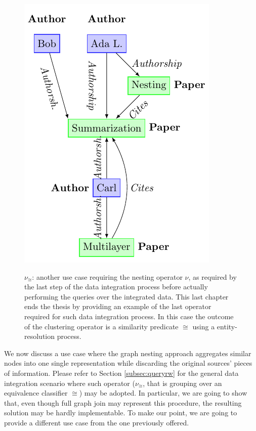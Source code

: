 \begin{figure}
\begin{minipage}{\textwidth}
\centering
\includegraphics[scale=1]{fig/06nesting/02_result}
\label{fig:expresult}
\end{minipage}
\caption{$\nu_\cong$: another use case requiring the nesting operator $\nu$, as required by the last step of the data integration process before actually performing the queries over the integrated data. This last chapter ends the thesis by providing an example of the last operator required for such data integration process. In this case the outcome of the clustering operator is a similarity predicate $\cong$ using a entity-resolution process.}
\end{figure}
We now discuss a use case where the graph nesting approach aggregates similar nodes into one single representation while discarding the original sources' pieces of information. Please refer to Section \vref{subsec:queryrw} for the general data integration scenario where such operator ($\nu_\cong$, that is grouping over an equivalence classifier $\cong$) may be adopted. In particular, we are going to show that, even though full graph join may represent this procedure, the resulting solution may be hardly implementable. To make our point, we are going to provide a different use case from the one previously offered.

